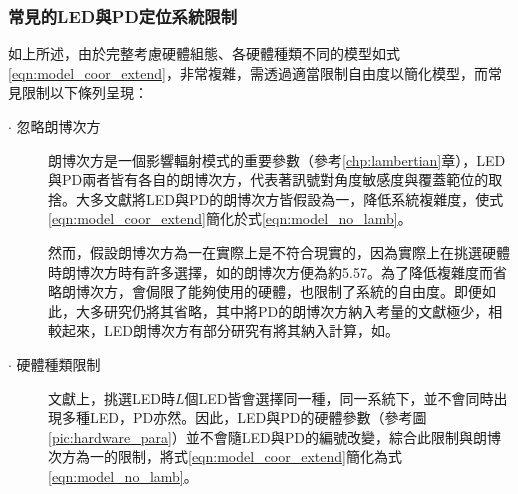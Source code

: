         \subsubsection{常見的LED與PD定位系統限制}
        \label{chp:LEDPD_restrict}

        如上所述，由於完整考慮硬體組態、各硬體種類不同的模型如式\ref{eqn:model_coor_extend}，非常複雜，需透過適當限制自由度以簡化模型，而常見限制以下條列呈現：

        \begin{description}
            \item[$\cdot$ 忽略朗博次方] \hfill
            
            \qquad
            朗博次方是一個影響輻射模式的重要參數（參考\ref{chp:lambertian}章），LED與PD兩者皆有各自的朗博次方，代表著訊號對角度敏感度與覆蓋範位的取捨。大多文獻將LED與PD的朗博次方皆假設為一，降低系統複雜度，使式\ref{eqn:model_coor_extend}簡化於式\ref{eqn:model_no_lamb}。

            \qquad
            然而，假設朗博次方為一在實際上是不符合現實的，因為實際上在挑選硬體時朗博次方時有許多選擇，如\cite{datasheet:led_vsma}的朗博次方便為約5.57。為了降低複雜度而省略朗博次方，會侷限了能夠使用的硬體，也限制了系統的自由度\cite{survey_light2018}。即便如此，大多研究仍將其省略，其中將PD的朗博次方納入考量的文獻極少\cite{survey_light2018}，相較起來，LED朗博次方有部分研究有將其納入計算，如\cite{case:cart2d}\cite{case:cart3d}。
            
            

            \item[$\cdot$ 硬體種類限制]\hfill
            
            \qquad
            文獻上，挑選LED時$L$個LED皆會選擇同一種，同一系統下，並不會同時出現多種LED，PD亦然。因此，LED與PD的硬體參數（參考圖\ref{pic:hardware_para}）並不會隨LED與PD的編號改變，綜合此限制與朗博次方為一的限制，將式\ref{eqn:model_coor_extend}簡化為式\ref{eqn:model_no_lamb}。


\end{description}

